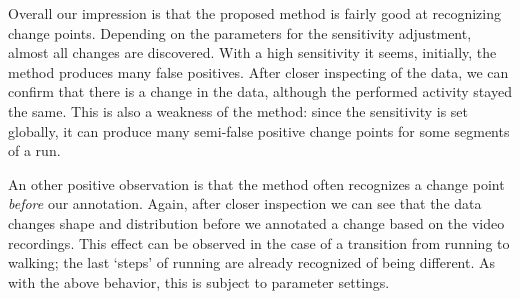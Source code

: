 Overall our impression is that the proposed method is fairly good at recognizing change points.
Depending on the parameters for the sensitivity adjustment, almost all changes are discovered.
With a high sensitivity it seems, initially, the method produces many false positives.
After closer inspecting of the data, we can confirm that there is a change in the data, although the performed activity stayed the same.
This is also a weakness of the method: since the sensitivity is set globally, it can produce many semi-false positive change points for some segments of a run.

An other positive observation is that the method often recognizes a change point \emph{before} our annotation.
Again, after closer inspection we can see that the data changes shape and distribution before we annotated a change based on the video recordings.
This effect can be observed in the case of a transition from running to walking; the last `steps' of running are already recognized of being different.
As with the above behavior, this is subject to parameter settings.

